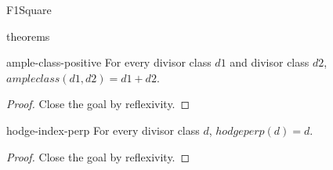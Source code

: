 \begin{lexlean}{F1Square}
\begin{section}{theorems}
  \begin{theorem}{ample-class-positive}
  \noaxioms
  For every divisor class \(d1\) and divisor class \(d2\), \(ampleclass(d1, d2) = d1 + d2\).
  \begin{proof}
  Close the goal by reflexivity.
  \end{proof}
  \end{theorem}

  \begin{theorem}{hodge-index-perp}
  \noaxioms
  For every divisor class \(d\), \(hodgeperp(d) = d\).
  \begin{proof}
  Close the goal by reflexivity.
  \end{proof}
  \end{theorem}
\end{section}
\end{lexlean}
